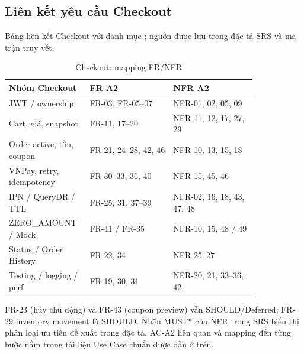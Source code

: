\subsection{Liên kết yêu cầu Checkout}
Bảng liên kết Checkout với danh mục ; nguồn
được lưu trong đặc tả SRS và ma trận truy vết.
\begin{longtable}{|p{0.21\linewidth}|p{0.31\linewidth}|p{0.31\linewidth}|}
\caption{Checkout: mapping FR/NFR}\label{tab:auto-checkout-use-case-2}\\
\hline
\textbf{Nhóm Checkout} & \textbf{FR A2} & \textbf{NFR A2} \\ \hline
JWT / ownership & FR-03, FR-05--07 & NFR-01, 02, 05, 09 \\ \hline
Cart, giá, snapshot & FR-11, 17--20 & NFR-11, 12, 17, 27, 29 \\ \hline
Order active, tồn, coupon & FR-21, 24--28, 42, 46 & NFR-10, 13, 15, 18 \\ \hline
VNPay, retry, idempotency & FR-30--33, 36, 40 & NFR-15, 45, 46 \\ \hline
IPN / QueryDR / TTL & FR-25, 31, 37--39 & NFR-02, 16, 18, 43, 47, 48 \\ \hline
ZERO\_AMOUNT / Mock & FR-41 / FR-35 & NFR-10, 15, 48 / 49 \\ \hline
Status / Order History & FR-22, 34 & NFR-25--27 \\ \hline
Testing / logging / perf & FR-19, 30, 31 & NFR-20, 21, 33--36, 42 \\ \hline
\end{longtable}
FR-23 (hủy chủ động) và FR-43 (coupon preview) vẫn SHOULD/Deferred;
FR-29 inventory movement là SHOULD. Nhãn MUST* của NFR trong SRS
biểu thị phân loại ưu tiên đề xuất trong đặc tả. AC-A2 liên quan và mapping
đến từng bước nằm trong tài liệu Use Case chuẩn được dẫn ở trên.

